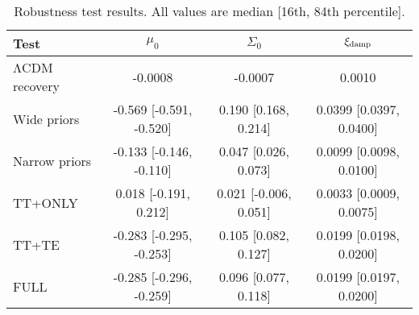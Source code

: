 \begin{table}[t]
\centering
\caption{Robustness test results. All values are median [16th, 84th percentile].}
\label{tab:robustness}
\begin{tabular}{lccc}
\hline
Test & $\mu_0$ & $\Sigma_0$ & $\xi_{\rm damp}$ \\
\hline
ΛCDM recovery & -0.0008 & -0.0007 & 0.0010 \\
Wide priors & -0.569 [-0.591, -0.520] & 0.190 [0.168, 0.214] & 0.0399 [0.0397, 0.0400] \\
Narrow priors & -0.133 [-0.146, -0.110] & 0.047 [0.026, 0.073] & 0.0099 [0.0098, 0.0100] \\
\hline
TT+ONLY & 0.018 [-0.191, 0.212] & 0.021 [-0.006, 0.051] & 0.0033 [0.0009, 0.0075] \\
TT+TE & -0.283 [-0.295, -0.253] & 0.105 [0.082, 0.127] & 0.0199 [0.0198, 0.0200] \\
FULL & -0.285 [-0.296, -0.259] & 0.096 [0.077, 0.118] & 0.0199 [0.0197, 0.0200] \\
\hline
\end{tabular}
\end{table}
